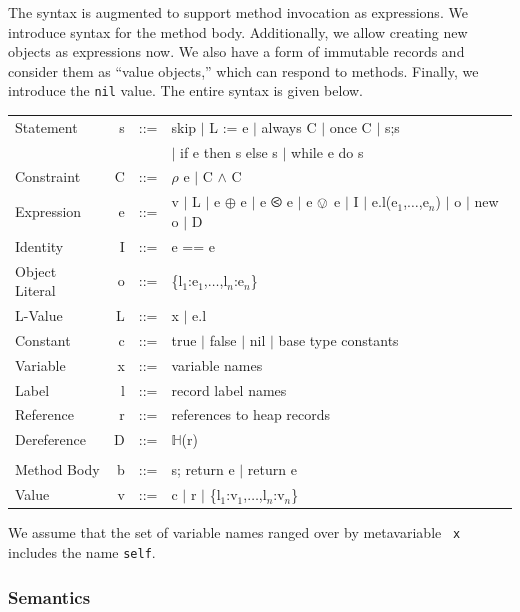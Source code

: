 \documentclass{article}
\renewcommand{\H}{$\mathbb{H}$}
\begin{document}
The syntax is augmented to support method invocation as expressions. We introduce
syntax for the method body.
Additionally, we allow creating new objects as expressions
now. We also have a form of immutable records and consider them as
``value objects,'' which can respond to methods.   Finally, we
introduce the {\tt nil} value.  The entire syntax is given below.

\begin{tt}
\begin{tabular}{lrrl}
{\rm Statement} & s & ::= & skip $\mid$ L := e $\mid$ always C $\mid$ once C $\mid$ s;s \\
  & & & $\mid$ if e then s else s $\mid$ while e do s \\
{\rm Constraint} & C & ::= & $\rho$ e $\mid$ C $\wedge$ C\\
{\rm Expression} & e & ::= & v $\mid$ L $\mid$ e $\oplus$ e
$\mid$ e $\olessthan$ e $\mid$ e $\ovee$ e $\mid$ I $\mid$
e.l(e$_1$,$\ldots$,e$_n$) $\mid$ o $\mid$ new o $\mid$ D\\
{\rm Identity} & I & ::= & e == e\\
{\rm Object Literal} & o & ::= &  \{l$_1$:e$_1$,$\ldots$,l$_n$:e$_n$\} \\
{\rm L-Value} & L & ::= & x $\mid$ e.l \\
{\rm Constant} & c & ::= & true $\mid$ false $\mid$ nil $\mid$ {\rm base type constants}\\
{\rm Variable} & x & ::= & {\rm variable names} \\
{\rm Label} & l & ::= & {\rm record label names} \\
{\rm Reference} & r & ::= & {\rm references to heap records} \\
{\rm Dereference} & D & ::= & \H(r) \\\\
{\rm Method Body} & b & ::= & s; return e $\mid$ return e \\

{\rm Value} & v & ::= & c $\mid$ r $\mid$ \{l$_1$:v$_1$,$\ldots$,l$_n$:v$_n$\} \\
\end{tabular}
\end{tt}

We assume that the set of variable names ranged over by metavariable {\tt
  x} includes the name {\tt self}.

\subsubsection{Semantics}
\end{document}
